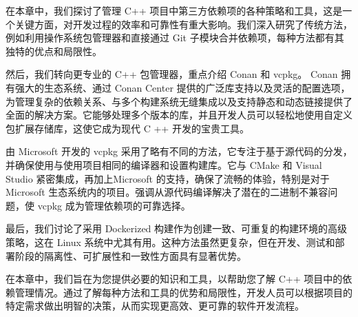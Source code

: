 在本章中，我们探讨了管理 C++ 项目中第三方依赖项的各种策略和工具，这是一个关键方面，对开发过程的效率和可靠性有重大影响。我们深入研究了传统方法，例如利用操作系统包管理器和直接通过 Git 子模块合并依赖项，每种方法都有其独特的优点和局限性。

然后，我们转向更专业的 C++ 包管理器，重点介绍 Conan 和 vcpkg。 Conan 拥有强大的生态系统、通过 Conan Center 提供的广泛库支持以及灵活的配置选项，为管理复杂的依赖关系、与多个构建系统无缝集成以及支持静态和动态链接提供了全面的解决方案。它能够处理多个版本的库，并且开发人员可以轻松地使用自定义包扩展存储库，这使它成为现代 C ++ 开发的宝贵工具。

由 Microsoft 开发的 vcpkg 采用了略有不同的方法，它专注于基于源代码的分发，并确保使用与使用项目相同的编译器和设置构建库。它与 CMake 和 Visual Studio 紧密集成，再加上Microsoft 的支持，确保了流畅的体验，特别是对于 Microsoft 生态系统内的项目。强调从源代码编译解决了潜在的二进制不兼容问题，使 vcpkg 成为管理依赖项的可靠选择。

最后，我们讨论了采用 Dockerized 构建作为创建一致、可重复的构建环境的高级策略，这在 Linux 系统中尤其有用。这种方法虽然更复杂，但在开发、测试和部署阶段的隔离性、可扩展性和一致性方面具有显著优势。

在本章中，我们旨在为您提供必要的知识和工具，以帮助您了解 C++ 项目中的依赖管理情况。通过了解每种方法和工具的优势和局限性，开发人员可以根据项目的特定需求做出明智的决策，从而实现更高效、更可靠的软件开发流程。